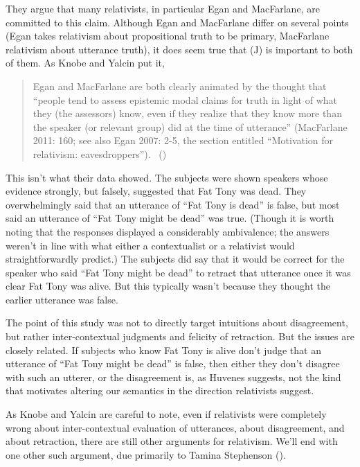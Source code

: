 \documentclass[
  10pt,
  letterpaper,
  DIV=11,
  numbers=noendperiod,
  twoside]{scrartcl}
\begin{document}
They argue that many relativists, in particular Egan and MacFarlane, are
committed to this claim. Although Egan and MacFarlane differ on several
points (Egan takes relativism about propositional truth to be primary,
MacFarlane relativism about utterance truth), it does seem true that (J)
is important to both of them. As Knobe and Yalcin put it,

\begin{quote}
Egan and MacFarlane are both clearly animated by the thought that
``people tend to assess epistemic modal claims for truth in light of
what they (the assessors) know, even if they realize that they know more
than the speaker (or relevant group) did at the time of utterance''
(MacFarlane 2011: 160; see also Egan 2007: 2-5, the section entitled
``Motivation for relativism: eavesdroppers'').
~()
\end{quote}

This isn't what their data showed. The subjects were shown speakers
whose evidence strongly, but falsely, suggested that Fat Tony was dead.
They overwhelmingly said that an utterance of ``Fat Tony is dead'' is
false, but most said an utterance of ``Fat Tony might be dead'' was
true. (Though it is worth noting that the responses displayed a
considerably ambivalence; the answers weren't in line with what either a
contextualist or a relativist would straightforwardly predict.) The
subjects did say that it would be correct for the speaker who said ``Fat
Tony might be dead'' to retract that utterance once it was clear Fat
Tony was alive. But this typically wasn't because they thought the
earlier utterance was false.

The point of this study was not to directly target intuitions about
disagreement, but rather inter-contextual judgments and felicity of
retraction. But the issues are closely related. If subjects who know Fat
Tony is alive don't judge that an utterance of ``Fat Tony might be
dead'' is false, then either they don't disagree with such an utterer,
or the disagreement is, as Huvenes suggests, not the kind that motivates
altering our semantics in the direction relativists suggest.

As Knobe and Yalcin are careful to note, even if relativists were
completely wrong about inter-contextual evaluation of utterances, about
disagreement, and about retraction, there are still other arguments for
relativism. We'll end with one other such argument, due primarily to
Tamina Stephenson ().
\end{document}
